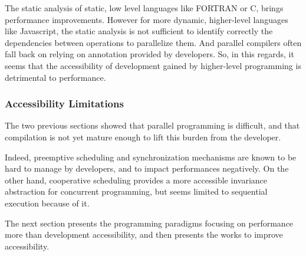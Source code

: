 The static analysis of static, low level languages like FORTRAN or C, brings performance improvements.
However for more dynamic, higher-level languages like Javascript, the static analysis is not sufficient to identify correctly the dependencies between operations to parallelize them.
And parallel compilers often fall back on relying on annotation provided by developers.
So, in this regards, it seems that the accessibility of development gained by higher-level programming is detrimental to performance.

\subsubsection{Accessibility Limitations}

The two previous sections showed that parallel programming is difficult, and that compilation is not yet mature enough to lift this burden from the developer. 

Indeed, preemptive scheduling and synchronization mechanisms are known to be hard to manage by developers, and to impact performances negatively.
On the other hand, cooperative scheduling provides a more accessible invariance abstraction for concurrent programming, but seems limited to sequential execution because of it.

The next section presents the programming paradigms focusing on performance more than development accessibility, and then presents the works to improve accessibility.








